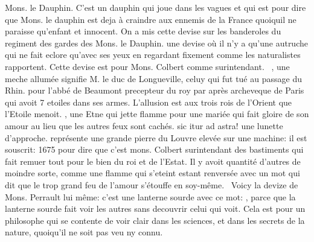  Mons. le Dauphin. C'est un dauphin qui joue dans les vagues et qui est  pour dire que Mons. le dauphin est deja à craindre aux ennemis de la France\protect{} quoiquil ne paraisse qu'enfant et innocent. On a mis cette devise sur les banderoles du regiment des gardes des Mons. le Dauphin.  une devise où il n'y a qu'une autruche qui ne fait eclore qu'avec ses yeux en regardant fixement comme les naturalistes\protect{} rapportent. Cette devise est pour Mons. Colbert\protect{} comme surintendant. \textendash\ , une meche allum\'{e}e signifie M. le duc de Longueville\protect{}, celuy qui fut tu\'{e} au passage du Rhin\protect{}.  pour l'abb\'{e} de Beaumont\protect{} precepteur du roy\protect{} par apr\`{e}s archeveque de Paris\protect{} qui avoit 7 etoiles dans ses armes. L'allusion est aux trois rois de l'Orient que l'Etoile menoit. , une Etne\protect{} qui jette flamme pour une mari\'{e}e qui fait gloire de son amour au lieu que les autres feux sont cach\'{e}s.
\pend%
\count{}
\count{}
\count{}
\pstart%
 sic itur ad astra! une lunette d'approche.
\pend%
\pstart%
%
 repr\'{e}sente une grande pierre du Louvre\protect{} elev\'{e}e sur une machine: il est souscrit:  1675 pour dire que c'est mons. Colbert\protect{} surintendant des bastiments qui fait remuer tout pour le bien du roi et de l'Estat.%
\pend%
\pstart%
Il y avoit quantité d'autres de moindre sorte, comme une flamme qui s'eteint estant renvers\'{e}e avec un mot qui dit que le trop grand feu de l'amour s'\'{e}touffe en soy-même. \textendash\ Voicy la devize de Mons. Perrault\protect{} lui même:
c'est une lanterne sourde avec ce mot: , parce que la lanterne sourde fait voir les autres sans decouvrir celui qui voit. Cela est pour un philosophe qui se contente de voir clair dans les sciences, et dans les secrets de la nature\protect{}, quoiqu'il ne soit pas veu ny connu.
